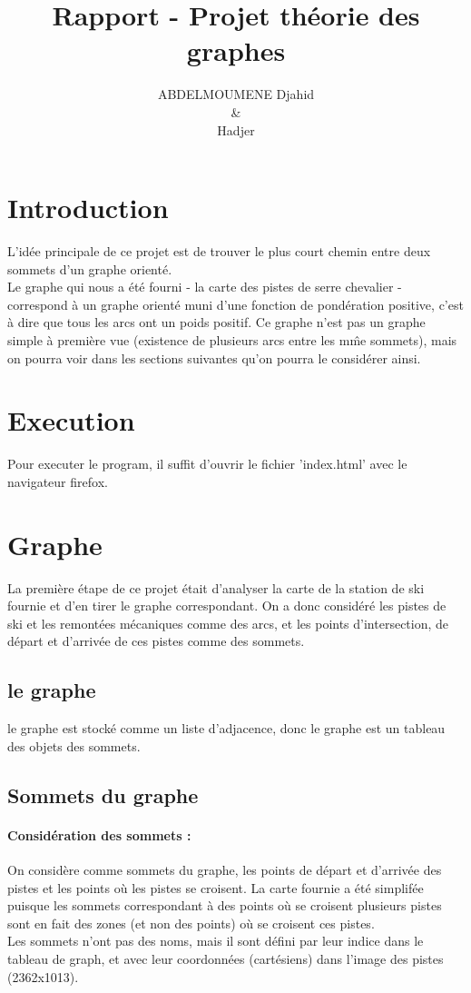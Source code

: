 \documentclass{article}
\title{Rapport - Projet th\'eorie des graphes}
\author{ABDELMOUMENE Djahid\\\&\\ Hadjer}
\begin{document}
\maketitle
\section{Introduction}
			L'id\'ee principale de ce projet est de trouver le plus court chemin entre deux sommets d'un graphe orient\'e.\\
			Le graphe qui nous a \'et\'e fourni - la carte des pistes de serre chevalier - correspond \`a un graphe orient\'e muni d'une fonction de pond\'eration positive, 
			c'est \`a dire que tous les arcs ont un poids positif. Ce graphe n'est pas un graphe simple \`a premi\`ere vue (existence de plusieurs arcs 
			entre les m\^me sommets), mais on pourra voir dans les sections suivantes qu'on pourra le consid\'erer ainsi.

\section{Execution}
Pour executer le program, il suffit d'ouvrir le fichier 'index.html' avec le navigateur firefox.
	\section{Graphe}
			La premi\`ere \'etape de ce projet \'etait d'analyser la carte de la station de ski fournie et d'en tirer le graphe correspondant. 
			On a donc consid\'er\'e les pistes de ski et les remont\'ees m\'ecaniques comme des arcs, et les points d'intersection, de d\'epart et 
			d'arriv\'ee de ces pistes comme des sommets.
		\subsection{le graphe}
			le graphe est stock\'e comme un liste d'adjacence, donc le graphe est un tableau des objets des sommets. 
		\subsection{Sommets du graphe}
			\paragraph{Consid\'eration des sommets :\\}
			On consid\`ere comme sommets du graphe, les points de d\'epart et d'arriv\'ee des pistes et les points o\`u les pistes se croisent. 
			La carte fournie a \'et\'e simplif\'ee puisque les sommets correspondant \`a des points o\`u se croisent plusieurs pistes sont en fait des zones 
			(et non des points) o\`u se croisent ces pistes.\\
			Les sommets n'ont pas des noms, mais il sont d\'efini par leur indice dans le tableau de graph, et avec leur coordonn\'ees (cart\'esiens) dans l'image des pistes (2362x1013).
\end{document}
